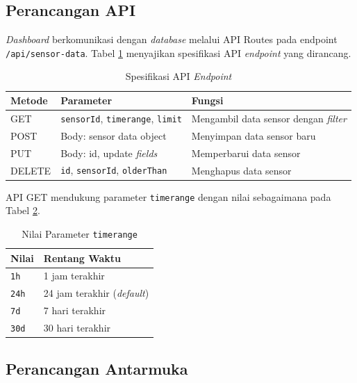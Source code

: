 \subsection{Perancangan API}

\textit{Dashboard} berkomunikasi dengan \textit{database} melalui API Routes pada endpoint \texttt{/api/sensor-data}. Tabel \ref{tab:spesifikasi-api} menyajikan spesifikasi API \textit{endpoint} yang dirancang.

\begin{table}[H]
  \caption{Spesifikasi API \textit{Endpoint}}
  \label{tab:spesifikasi-api}
  \begin{tabularx}{\textwidth}{| l | l | X |}
    \hline
    \textbf{Metode} & \textbf{Parameter} & \textbf{Fungsi} \\
    \hline
    GET & \texttt{sensorId}, \texttt{timerange}, \texttt{limit} & Mengambil data sensor dengan \textit{filter} \\
    \hline
    POST & Body: sensor data object & Menyimpan data sensor baru \\
    \hline
    PUT & Body: id, update \textit{fields} & Memperbarui data sensor \\
    \hline
    DELETE & \texttt{id}, \texttt{sensorId}, \texttt{olderThan} & Menghapus data sensor \\
    \hline
  \end{tabularx}
\end{table}

API GET mendukung parameter \texttt{timerange} dengan nilai sebagaimana pada Tabel \ref{tab:parameter-timerange}.

\begin{table}[H]
  \caption{Nilai Parameter \texttt{timerange}}
  \label{tab:parameter-timerange}
  \begin{tabularx}{\textwidth}{| l | X |}
    \hline
    \textbf{Nilai} & \textbf{Rentang Waktu} \\
    \hline
    \texttt{1h} & 1 jam terakhir \\
    \hline
    \texttt{24h} & 24 jam terakhir (\textit{default}) \\
    \hline
    \texttt{7d} & 7 hari terakhir \\
    \hline
    \texttt{30d} & 30 hari terakhir \\
    \hline
  \end{tabularx}
\end{table}

\subsection{Perancangan Antarmuka}

